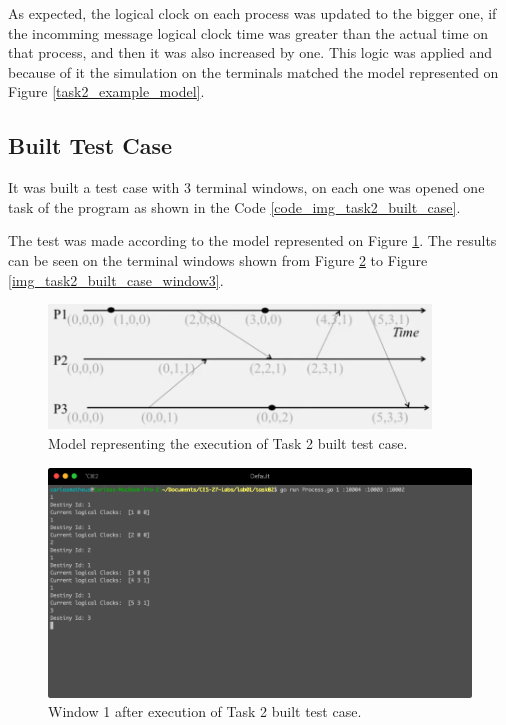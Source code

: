 \documentclass[a4paper, 11pt]{article}
\begin{document}
As expected, the logical clock on each process was updated to the bigger one, if the incomming message logical clock time was greater than the actual time on that process, and then it was also increased by one. This logic was applied and because of it the simulation on the terminals matched the model represented on Figure \ref{task2_example_model}.

\subsection*{Built Test Case}

It was built a test case with 3 terminal windows, on each one was opened one task of the program as shown in the Code \ref{code_img_task2_built_case}.

The test was made according to the model represented on Figure \ref{img_task2_built_case_model}. The results can be seen on the terminal windows shown from Figure \ref{img_task2_built_case_window1} to Figure \ref{img_task2_built_case_window3}.

\begin{figure}[h]
  \begin{center}
  \includegraphics[width=4in]{./imgs/task2_built_case_model.jpeg}
  \caption{Model representing the execution of Task 2 built test case.}
  \label{img_task2_built_case_model}
  \end{center}
\end{figure}



\begin{figure}[h]
  \begin{center}
  \includegraphics[width=4.5in]{./imgs/task2_buit_test_window1.png}
  \caption{Window 1 after execution of Task 2 built test case.}
  \label{img_task2_built_case_window1}
  \end{center}
\end{figure}
\end{document}

